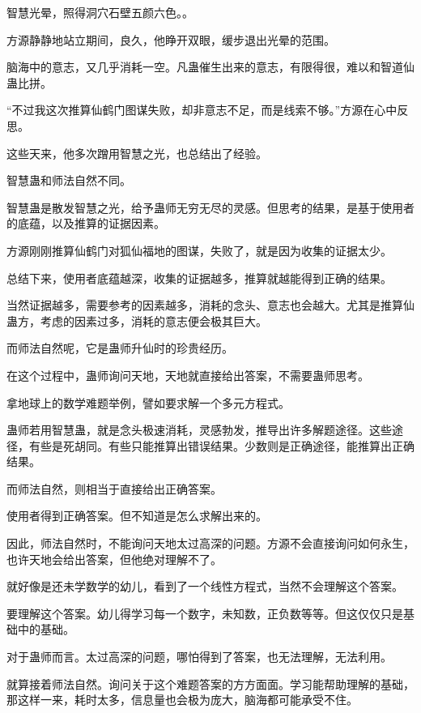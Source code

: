 
\begin{this_body}

智慧光晕，照得洞穴石壁五颜六色。。

方源静静地站立期间，良久，他睁开双眼，缓步退出光晕的范围。

脑海中的意志，又几乎消耗一空。凡蛊催生出来的意志，有限得很，难以和智道仙蛊比拼。

“不过我这次推算仙鹤门图谋失败，却非意志不足，而是线索不够。”方源在心中反思。

这些天来，他多次蹭用智慧之光，也总结出了经验。

智慧蛊和师法自然不同。

智慧蛊是散发智慧之光，给予蛊师无穷无尽的灵感。但思考的结果，是基于使用者的底蕴，以及推算的证据因素。

方源刚刚推算仙鹤门对狐仙福地的图谋，失败了，就是因为收集的证据太少。

总结下来，使用者底蕴越深，收集的证据越多，推算就越能得到正确的结果。

当然证据越多，需要参考的因素越多，消耗的念头、意志也会越大。尤其是推算仙蛊方，考虑的因素过多，消耗的意志便会极其巨大。

而师法自然呢，它是蛊师升仙时的珍贵经历。

在这个过程中，蛊师询问天地，天地就直接给出答案，不需要蛊师思考。

拿地球上的数学难题举例，譬如要求解一个多元方程式。

蛊师若用智慧蛊，就是念头极速消耗，灵感勃发，推导出许多解题途径。这些途径，有些是死胡同。有些只能推算出错误结果。少数则是正确途径，能推算出正确结果。

而师法自然，则相当于直接给出正确答案。

使用者得到正确答案。但不知道是怎么求解出来的。

因此，师法自然时，不能询问天地太过高深的问题。方源不会直接询问如何永生，也许天地会给出答案，但他绝对理解不了。

就好像是还未学数学的幼儿，看到了一个线性方程式，当然不会理解这个答案。

要理解这个答案。幼儿得学习每一个数字，未知数，正负数等等。但这仅仅只是基础中的基础。

对于蛊师而言。太过高深的问题，哪怕得到了答案，也无法理解，无法利用。

就算接着师法自然。询问关于这个难题答案的方方面面。学习能帮助理解的基础，那这样一来，耗时太多，信息量也会极为庞大，脑海都可能承受不住。


\end{this_body}
